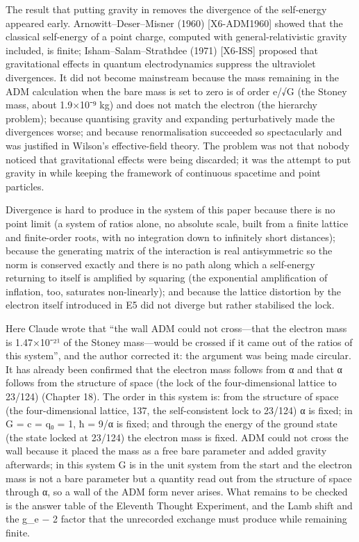 \documentclass[
  a4paper,
]{article}
\begin{document}
The result that putting gravity in removes the divergence of the
self-energy appeared early. Arnowitt--Deser--Misner (1960)
{[}X6-ADM1960{]} showed that the classical self-energy of a point
charge, computed with general-relativistic gravity included, is finite;
Isham--Salam--Strathdee (1971) {[}X6-ISS{]} proposed that gravitational
effects in quantum electrodynamics suppress the ultraviolet divergences.
It did not become mainstream because the mass remaining in the ADM
calculation when the bare mass is set to zero is of order e/√G (the
Stoney mass, about 1.9×10⁻⁹ kg) and does not match the electron (the
hierarchy problem); because quantising gravity and expanding
perturbatively made the divergences worse; and because renormalisation
succeeded so spectacularly and was justified in Wilson's effective-field
theory. The problem was not that nobody noticed that gravitational
effects were being discarded; it was the attempt to put gravity in while
keeping the framework of continuous spacetime and point particles.

Divergence is hard to produce in the system of this paper because there
is no point limit (a system of ratios alone, no absolute scale, built
from a finite lattice and finite-order roots, with no integration down
to infinitely short distances); because the generating matrix of the
interaction is real antisymmetric so the norm is conserved exactly and
there is no path along which a self-energy returning to itself is
amplified by squaring (the exponential amplification of inflation, too,
saturates non-linearly); and because the lattice distortion by the
electron itself introduced in E5 did not diverge but rather stabilised
the lock.

Here Claude wrote that ``the wall ADM could not cross---that the
electron mass is 1.47×10⁻²¹ of the Stoney mass---would be crossed if it
came out of the ratios of this system'', and the author corrected it:
the argument was being made circular. It has already been confirmed that
the electron mass follows from α and that α follows from the structure
of space (the lock of the four-dimensional lattice to 23/124) (Chapter
18). The order in this system is: from the structure of space (the
four-dimensional lattice, 137, the self-consistent lock to 23/124) α is
fixed; in G = c = q₀ = 1, ħ = 9/α is fixed; and through the energy of
the ground state (the state locked at 23/124) the electron mass is
fixed. ADM could not cross the wall because it placed the mass as a free
bare parameter and added gravity afterwards; in this system G is in the
unit system from the start and the electron mass is not a bare parameter
but a quantity read out from the structure of space through α, so a wall
of the ADM form never arises. What remains to be checked is the answer
table of the Eleventh Thought Experiment, and the Lamb shift and the
g\_e − 2 factor that the unrecorded exchange must produce while
remaining finite.
\end{document}
